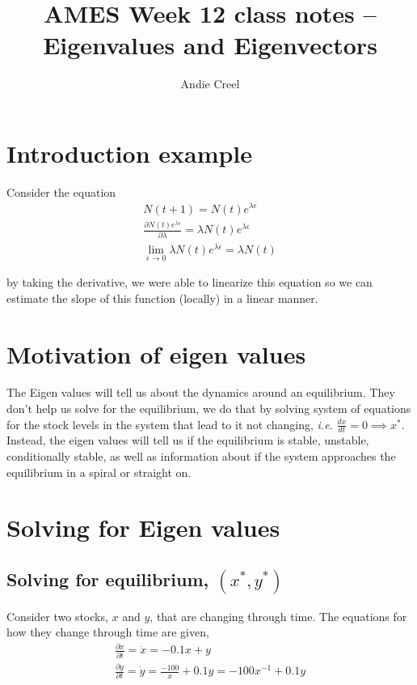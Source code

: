 \documentclass{article}
\title{AMES Week 12 class notes -- Eigenvalues and Eigenvectors }
\author{Andie Creel}
\begin{document}
\maketitle

\section{Introduction example }

Consider the equation 
\begin{align*}
    N(t+1) = N(t) e^{\lambda \epsilon} \\
    \frac{\partial N(t) e^{\lambda \epsilon}}{\partial \lambda} = \lambda  N(t) e^{\lambda \epsilon} \\
    \lim_{\epsilon \rightarrow 0 }  \lambda  N(t) e^{\lambda \epsilon} = \lambda  N(t) 
\end{align*}

by taking the derivative, we were able to linearize this equation so we can estimate the slope of this function (locally) in a linear manner. 

\section{Motivation of eigen values}
The Eigen values will tell us about the dynamics around an equilibrium. They don't help us solve for the equilibrium, we do that by solving system of equations for the stock levels in the system that lead to it not changing, \textit{i.e.} $\frac{d x}{d t} = 0 \implies x^*$. Instead, the eigen values will tell us if the equilibrium is stable, unstable, conditionally stable, as well as information about if the system approaches the equilibrium in a spiral or straight on. 

\section{Solving for Eigen values}

\subsection{Solving for equilibrium, $(x^*, y^*)$}

Consider two stocks, $x$ and $y$, that are changing through time. The equations for how they change through time are given, 
\begin{align}
    \frac{\partial x}{\partial t} = \dot x = -0.1x + y \\
    \frac{\partial y}{\partial t} = \dot y = \frac{-100}{x} + 0.1 y = -100 x^{-1} + 0.1 y
\end{align}
\end{document}
